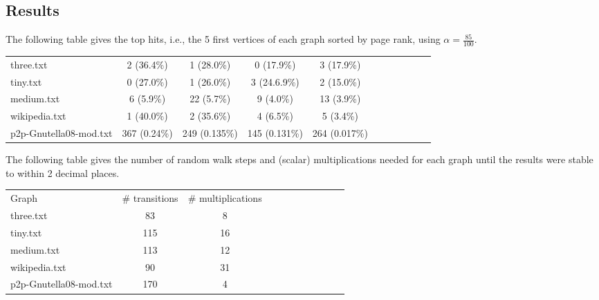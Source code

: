 \documentclass{tufte-handout}
\begin{document}
\subsection{Results}

The following table gives the top hits, i.e., the 5 first vertices of
each graph sorted by page rank, using $\alpha = \frac{85}{100}$.

\medskip
\begin{fullwidth}
\small
\begin{tabular}{lcccccccccc}
three.txt & 2 (36.4\%) & 1 (28.0\%) & 0 (17.9\%) & 3 (17.9\%) \\
tiny.txt & 0 (27.0\%) & 1 (26.0\%) & 3 (24.6.9\%) & 2 (15.0\%) \\
medium.txt & 6 (5.9\%) & 22 (5.7\%) & 9 (4.0\%) & 13 (3.9\%) \\
wikipedia.txt & 1 (40.0\%) & 2 (35.6\%) & 4 (6.5\%) & 5 (3.4\%) \\
p2p-Gnutella08-mod.txt & 367 (0.24\%) & 249 (0.135\%) & 145 (0.131\%) & 264 (0.017\%) \\
\end{tabular}
\end{fullwidth}

\bigskip The following table gives the number of random walk steps and
(scalar) multiplications needed for each graph until the results were
stable to within 2 decimal places.

\medskip
\begin{fullwidth}
\small
\begin{tabular}{lcccccccccc}
Graph & \# transitions  & \# multiplications \\
three.txt & 83 & 8 \\
tiny.txt & 115 & 16 \\
medium.txt & 113 & 12 \\
wikipedia.txt & 90 & 31 \\
p2p-Gnutella08-mod.txt & 170 & 4 \\
\end{tabular}
\end{fullwidth}
\end{document}
